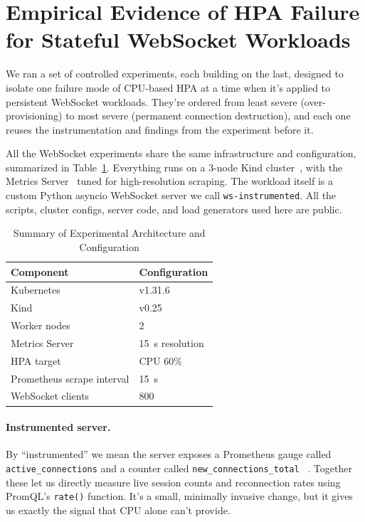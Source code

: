 \documentclass[twocolumn]{svjour3}
\begin{document}
\section{Empirical Evidence of HPA Failure for Stateful WebSocket Workloads}
\label{sec:problem}

We ran a set of controlled experiments, each building on the last, designed to
isolate one failure mode of CPU-based HPA at a time when it's applied to
persistent WebSocket workloads. They're ordered from least severe
(over-provisioning) to most severe (permanent connection destruction), and each one
reuses the instrumentation and findings from the experiment before it.

All the WebSocket experiments share the same infrastructure and configuration,
summarized in Table~\ref{tab:architecture}. Everything runs on a 3-node Kind
cluster~\cite{kind_docs,merkel2014docker}, with the Metrics
Server~\cite{k8s_metrics_server} tuned for high-resolution scraping. The workload
itself is a custom Python asyncio WebSocket server we call \texttt{ws-instrumented}.
All the scripts, cluster configs, server code, and load generators used here are
public.

\begin{table}[!ht]
\centering
\caption{Summary of Experimental Architecture and Configuration}
\label{tab:architecture}
\begin{tabular}{ll}
\toprule
\textbf{Component} & \textbf{Configuration} \\
\midrule
Kubernetes & v1.31.6 \\
Kind & v0.25 \\
Worker nodes & 2 \\
Metrics Server & 15~s resolution \\
HPA target & CPU 60\% \\
Prometheus scrape interval & 15~s \\
WebSocket clients & 800 \\
\bottomrule
\end{tabular}
\end{table}

\paragraph{Instrumented server.}
By ``instrumented'' we mean the server exposes a Prometheus gauge called
\texttt{active\_connections} and a counter called \texttt{new\_connections\_total}
~\cite{prometheus_client_python,prometheus_docs}. Together these let us directly
measure live session counts and reconnection rates using PromQL's \texttt{rate()}
function. It's a small, minimally invasive change, but it gives us exactly the
signal that CPU alone can't provide.
\end{document}
